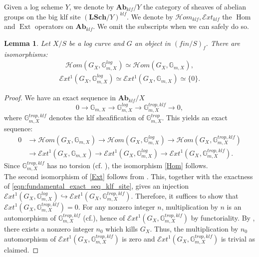 \documentclass[a4paper,11pt]{amsart} %
\numberwithin{equation}{subsection}
\newcommand{\bb}[1]{{\mathbb{#1}}}
\newcommand{\bd}[1]{{\mathbf{#1}}}
\def\sheafhom{\mathcal{H}om}
\def\sheafext{\mathcal{E}xt}
\newcommand{\cat}[1]{\bd{#1}}
\theoremstyle{definition}
\theoremstyle{plain}%
\newtheorem{lemma}[definition]{Lemma}
\theoremstyle{remark}
\begin{document}
Given a log scheme $Y$, we denote by $\cat{Ab}_{klf}/Y$ the category of sheaves of abelian groups on the big klf site $(\cat{LSch}/Y)^{klf}$. We denote by $\sheafhom_{klf},\sheafext_{klf}$ the $\operatorname{Hom}$ and $\operatorname{Ext}$ operators on $\cat{Ab}_{klf}$. We omit the subscripts when we can safely do so.

\begin{lemma}\label{Hom and Ext}
 Let $X/S$ be a log curve and $G$ an object in $(fin/S)_f$. There are isomorphisms:
\begin{align}\label{Hom}
\sheafhom(G_{X},\mathbb{G}_{m,X_{}}^{log}) \simeq \sheafhom(G_{X},\mathbb{G}_{m,X_{}}),
\end{align}
\begin{align}\label{Ext}
\sheafext^1(G_{X},\mathbb{G}_{m,X_{}}^{log}) \simeq \sheafext^1(G_{X_{}},\mathbb{G}_{m,X_{}}) \simeq \{0\}.
\end{align}
\end{lemma}

\begin{proof}
 We have an exact sequence in $\cat{Ab}_{klf}/X$
\begin{equation}\label{eqn:fundamental_exact_seq_klf_site}
    0 \to  \mathbb{G}_{m,X_{}} \to \mathbb{G}_{m,X_{}}^{log} \to \mathbb{G}_{m,X_{}}^{trop,klf} \to 0,
\end{equation}
where $\mathbb{G}_{m,X_{}}^{trop,klf}$ denotes the klf sheafification of $\bb G_{m,X}^{trop}$.
This yields an exact sequence:
\begin{align*}
     0 &\to \sheafhom(G_{X_{}},\mathbb{G}_{m,X_{}}) \to \sheafhom(G_{X_{}},\mathbb{G}_{m,X_{}}^{log}) \to \sheafhom(G_{X_{}},\mathbb{G}_{m,X_{}}^{trop,klf})\\
     &\to \sheafext^1(G_{X_{}},\mathbb{G}_{m,X_{}}) \to \sheafext^1(G_{X},\mathbb{G}_{m,X_{}}^{log}) \to  \sheafext^1(G_{X_{}},\mathbb{G}_{m,X_{}}^{trop,klf}).
\end{align*}
Since $\mathbb{G}_{m,X_{}}^{trop,klf}$ has no torsion (cf. \cite[Lemma 2.3.1]{Gill}), the isomorphism \ref{Hom} follows.\\

The second isomorphism of \ref{Ext} follows from \cite[Theorem 4.1]{Gill'}. This, together with the exactness of \ref{eqn:fundamental_exact_seq_klf_site}, gives an injection $\sheafext^1(G_{X},\mathbb{G}_{m,X_{}}^{log}) \hookrightarrow \sheafext^1(G_{X},\mathbb{G}_{m,X_{}}^{trop, klf})$. Therefore, it suffices to show that $\sheafext^1(G_{X},\mathbb{G}_{m,X_{}}^{trop, klf})=0$. For any nonzero integer $n$, multiplication by $n$ is an automorphism of $\mathbb{G}_{m,X_{}}^{trop, klf}$ (cf.\cite[Lemma 2.3.1]{Gill}), hence of $\sheafext^1(G_{X},\mathbb{G}_{m,X_{}}^{trop, klf})$ by functoriality. By \cite[\S 2]{katoJuin}, there exists a nonzero integer $n_0$ which kills $G_{X}$. Thus, the multiplication by $n_0$ automorphism of $\sheafext^1(G_{X},\mathbb{G}_{m,X_{}}^{trop, klf})$ is zero and $\sheafext^1(G_{X},\mathbb{G}_{m,X_{}}^{trop, klf})$ is trivial as claimed.
\end{proof}
\end{document}
